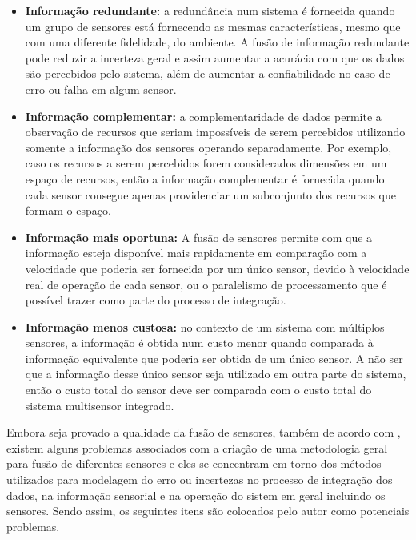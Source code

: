 \documentclass[acronym, symbols]{fei}
\begin{document}
			\begin{itemize}
				\item \textbf{Informação redundante:} a redundância num sistema é fornecida quando um grupo de sensores está fornecendo as mesmas características, mesmo que com uma diferente fidelidade, do ambiente. A fusão de informação redundante pode reduzir a incerteza geral e assim aumentar a acurácia com que os dados são percebidos pelo sistema, além de aumentar a confiabilidade no caso de erro ou falha em algum sensor.
				
				\item \textbf{Informação complementar:} a complementaridade de dados permite a observação de recursos que seriam impossíveis de serem percebidos utilizando somente a informação dos sensores operando separadamente. Por exemplo, caso os recursos a serem percebidos forem considerados dimensões em um espaço de recursos, então a informação complementar é fornecida quando cada sensor consegue apenas providenciar um subconjunto dos recursos que formam o espaço.
				
				\item \textbf{Informação mais oportuna:} A fusão de sensores permite com que a informação esteja disponível mais rapidamente em comparação com a velocidade que poderia ser fornecida por um único sensor, devido à velocidade real de operação de cada sensor, ou o paralelismo de processamento que é possível trazer como parte do processo de integração.
				
				\item \textbf{Informação menos custosa:} no contexto de um sistema com múltiplos sensores, a informação é obtida num custo menor quando comparada à informação equivalente que poderia ser obtida de um único sensor. A não ser que a informação desse único sensor seja utilizado em outra parte do sistema, então o custo total do sensor deve ser comparada com o custo total do sistema multisensor integrado.
			\end{itemize}
		
			Embora seja provado a qualidade da fusão de sensores, também de acordo com \textcite{luo1990tutorial}, existem alguns problemas associados com a criação de uma metodologia geral para fusão de diferentes sensores e eles se concentram em torno dos métodos utilizados para modelagem do erro ou incertezas no processo de integração dos dados, na informação sensorial e na operação do sistem em geral incluindo os sensores. Sendo assim, os seguintes itens são colocados pelo autor como potenciais problemas.
			
\end{document}
